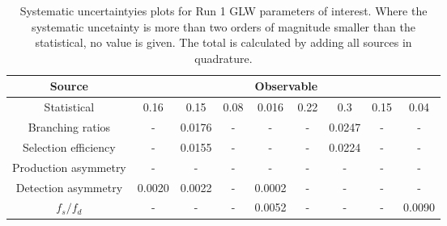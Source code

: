 \begin{table}
  \centering
  \begin{tabular}{ccccccccc}
      \toprule
      Source & \multicolumn{8}{c}{Observable} \\
      \midrule
      Statistical & 0.16 & 0.15 & 0.08 & 0.016 & 0.22 & 0.3 & 0.15 & 0.04 \\
      \midrule
      Branching ratios & \-- & 0.0176 & \-- & \-- & \-- & 0.0247 & \-- & \-- \\
      Selection efficiency & \-- & 0.0155 & \-- & \-- & \-- & 0.0224 & \-- & \-- \\
      Production asymmetry & \-- & \-- & \-- & \-- & \-- & \-- & \-- & \-- \\
      Detection asymmetry & 0.0020 & 0.0022 & \-- & 0.0002 & \-- & \-- & \-- & \-- \\
      $f_s/f_d$ & \-- & \-- & \-- & 0.0052 & \-- & \-- & \-- & 0.0090 \\
      \bottomrule
  \end{tabular}
  \caption{Systematic uncertaintyies plots for Run 1 GLW parameters of interest. Where the systematic uncetainty is more than two orders of magnitude smaller than the statistical, no value is given. The total is calculated by adding all sources in quadrature.}
\label{tab:KK_run1_systematics}
\end{table}
